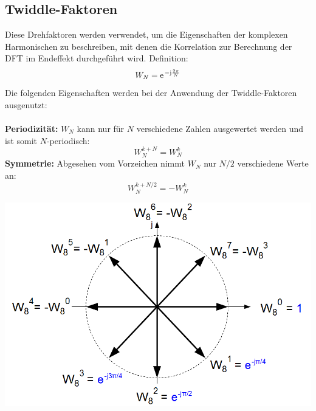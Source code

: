 \subsection{Twiddle-Faktoren}
Diese Drehfaktoren werden verwendet, um die Eigenschaften der komplexen Harmonischen
zu beschreiben, mit denen die Korrelation zur Berechnung der DFT im Endeffekt durchgeführt wird. 
Definition:
\[ W_N = \e^{-\im\frac{2\pi}{N}} \]
Die folgenden Eigenschaften werden bei der Anwendung der Twiddle-Faktoren ausgenutzt:\\\\
\textbf{Periodizität:} $W_N$ kann nur für $N$ verschiedene Zahlen ausgewertet werden und ist somit $N$-periodisch:
\[ W_N^{k+N} = W_N^k \]
\textbf{Symmetrie:} Abgesehen vom Vorzeichen nimmt $W_N$ nur $N/2$ verschiedene Werte an:
\[ W_N^{k+N/2} = -W_N^k \]
\begin{center}
	\includegraphics[width=.325\textwidth]{../fig/twiddle_factor}
\end{center}

